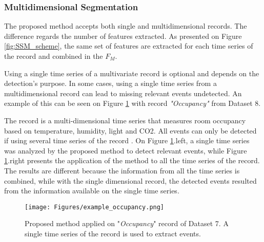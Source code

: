 \subsubsection{Multidimensional Segmentation}

The proposed method accepts both single and multidimensional records. The difference regards the number of features extracted. As presented on Figure \ref{fig:SSM_scheme}, the same set of features are extracted for each time series of the record and combined in the $F_M$. 
\par
Using a single time series of a multivariate record is optional and depends on the detection's purpose. In some cases, using a single time series from a multidimensional record can lead to missing relevant events undetected. An example of this can be seen on Figure \ref{fig:occupancy_uni} with record \textit{"Occupancy"} from Dataset 8. 
\par
The record is a multi-dimensional time series that measures room occupancy based on temperature, humidity, light and CO2. All events can only be detected if using several time series of the record \cite{cpd_alan}. On Figure \ref{fig:occupancy_uni}.left, a single time series was analyzed by the proposed method to detect relevant events, while Figure \ref{fig:occupancy_uni}.right presents the application of the method to all the time series of the record. The results are different because the information from all the time series is combined, while with the single dimensional record, the detected events resulted from the information available on the single time series.\\

\begin{figure}
    \centering
    \texttt{[image: Figures/example\_occupancy.png]}
    \caption{Proposed method applied on "\textit{Occupancy}" record of Dataset 7. A single time series of the record is used to extract events.}
    \label{fig:occupancy_uni}
\end{figure}




